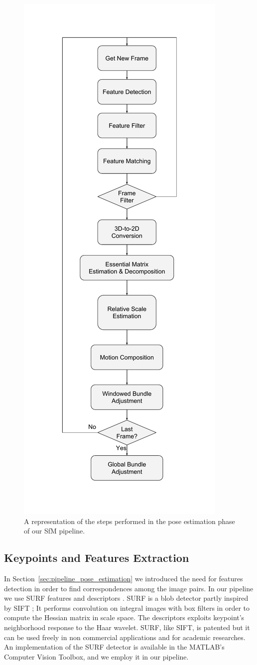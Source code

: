 \begin{figure}
	\centering
	\includegraphics[width=0.5\linewidth]{img/sfm_block.pdf}
	\caption{A representation of the steps performed in the pose estimation 
	phase of our SfM pipeline.}
	\label{fig:sfm_block}
\end{figure}

\subsection{Keypoints and Features Extraction}
In Section~\ref{sec:pipeline_pose_estimation} we introduced the need for 
features detection in order to find correspondences among the image pairs.
In our pipeline we use SURF features and descriptors 
\cite{bay2006surf}. SURF is a blob detector partly inspired by SIFT
\cite{lowe1999object};
It performs convolution on integral images with box filters in order to 
compute the Hessian matrix in scale space.
The descriptors exploits keypoint's neighborhood response to the Haar wavelet.
SURF, like SIFT, is patented but it can be used freely in non commercial
applications and for academic researches.
An implementation of the SURF detector is available in the MATLAB's Computer 
Vision Toolbox, and we employ it in our pipeline.

